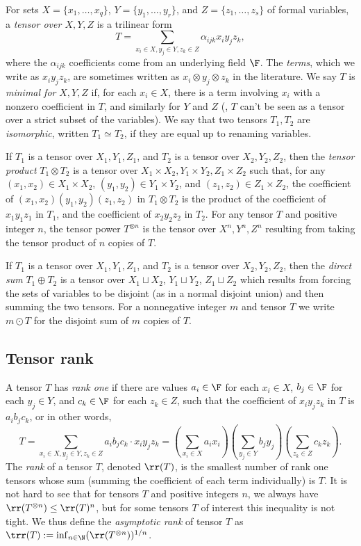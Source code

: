 \documentclass{toc}
\begin{document}
For sets $X = \{x_1, \ldots, x_q\}$, $Y = \{y_1, \ldots, y_r\}$, and $Z = \{z_1, \ldots, z_s \}$ of formal variables, a \emph{tensor over $X,Y,Z$} is a trilinear form
$$T = \sum_{x_i \in X, y_j \in Y, z_k \in Z} \alpha_{ijk} x_i y_j z_k,$$
where the $\alpha_{ijk}$ coefficients come from an underlying field $\F$. The \emph{terms}, which we write as $x_i y_j z_k$, are sometimes written as $x_i\otimes y_j\otimes z_k$ in the literature. We say $T$ is \emph{minimal for} $X,Y,Z$ if, for each $x_i \in X$, there is a term involving $x_i$ with a nonzero coefficient in $T$, and similarly for $Y$ and $Z$ (\ie, $T$ can't be seen as a tensor over a strict subset of the variables). We say that two tensors $T_1, T_2$ are \emph{isomorphic}, written $T_1 \simeq T_2$, if they are equal up to renaming variables.

If $T_1$ is a tensor over $X_1, Y_1, Z_1$, and $T_2$ is a tensor over $X_2, Y_2, Z_2$, then the \emph{tensor product} $T_1 \otimes T_2$ is a tensor over $X_1 \times X_2, Y_1 \times Y_2, Z_1 \times Z_2$ such that, for any $(x_1,x_2) \in X_1 \times X_2$, $(y_1,y_2) \in Y_1 \times Y_2$, and $(z_1,z_2) \in  Z_1 \times Z_2$, the coefficient of $(x_1,x_2)(y_1,y_2)(z_1,z_2)$ in $T_1 \otimes T_2$ is the product of the coefficient of $x_1 y_1 z_1$ in $T_1$, and the coefficient of $x_2 y_2 z_2$ in $T_2$. 
For any tensor $T$ and positive integer $n$, the tensor power $T^{\otimes n}$ is the tensor over $X^n, Y^n, Z^n$ resulting from taking the tensor product of $n$ copies of $T$.

If $T_1$ is a tensor over $X_1, Y_1, Z_1$, and $T_2$ is a tensor over $X_2, Y_2, Z_2$, then the \emph{direct sum} $T_1 \oplus T_2$ is a tensor over $X_1 \sqcup X_2$, $Y_1 \sqcup Y_2$, $Z_1 \sqcup Z_2$ which results from forcing the  
%
sets of variables
to be disjoint (as in a normal disjoint union) and then summing the two tensors. For a nonnegative integer $m$ and tensor $T$ we write $m \odot T$ for the disjoint sum of $m$ copies of $T$.

%
\subsection{Tensor rank}

A tensor $T$ has \emph{rank one} if there are values $a_i \in \F$ for each $x_i \in X$, $b_j \in \F$ for each $y_j \in Y$, and $c_k \in \F$ for each $z_k \in Z$, such that the coefficient of $x_i y_j z_k$ in $T$ is $a_i b_j c_k$, or in other words,
$$T=\sum_{x_i \in X, y_j \in Y, z_k \in Z} a_i b_j c_k \cdot x_i y_j z_k = \left( \sum_{x_i \in X} a_i x_i \right) \left( \sum_{y_j \in Y} b_j y_j \right) \left( \sum_{z_k \in Z} c_k z_k \right).$$
The \emph{rank} of a tensor $T$, denoted $\rr(T)$, is the smallest number of rank one tensors whose sum (summing the coefficient of each term individually) is $T$. It is not hard to see that for tensors $T$ and positive integers $n$, we always have $\rr(T^{\otimes n}) \leq \rr(T)^n$, but for some tensors $T$ of interest this inequality is not tight. We thus define the \emph{asymptotic rank} of tensor $T$ as $\trr(T) := \inf_{n \in \N} (\rr(T^{\otimes n}))^{1/n}$.
\end{document}
